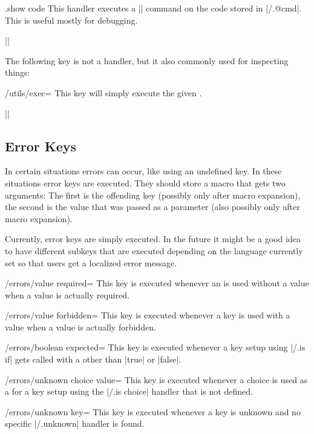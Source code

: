 \begin{handler}{{.show code}}
  This handler executes a |\show| command on the code stored in
  |/.@cmd|. This is useful mostly for debugging.

  \example ||
\end{handler}

The following key is not a handler, but it also commonly used for
inspecting things:
\begin{key}{/utils/exec=}
  This key will simply execute the given . 

  \example ||
\end{key}


\subsection{Error Keys}

In certain situations errors can occur, like using an undefined
key. In these situations error keys are executed. They should store a
macro that gets two arguments: The first is the offending key
(possibly only after macro expansion), the second is the value that
was passed as a parameter (also possibly only after macro expansion).

Currently, error keys are simply executed. In the future it might be a
good idea to have different subkeys that are executed depending on the
language currently set so that users get a localized error message.

\begin{key}{/errors/value required=}
  This key is executed whenever an  is used
  without a value when a value is actually required. 
\end{key}

\begin{key}{/errors/value forbidden=}
  This key is executed whenever a key is used with a value when a
  value is actually forbidden.
\end{key}

\begin{key}{/errors/boolean expected=}
  This key is executed whenever a key setup using |/.is if| gets called
  with a  other than |true| or |false|.
\end{key}

\begin{key}{/errors/unknown choice value=}
  This key is executed whenever a choice is used as a  for
  a key setup using the |/.is choice| handler that is not defined.
\end{key}

\begin{key}{/errors/unknown key=}
  This key is executed whenever a key is unknown and no specific
  |/.unknown| handler is found.
\end{key}


